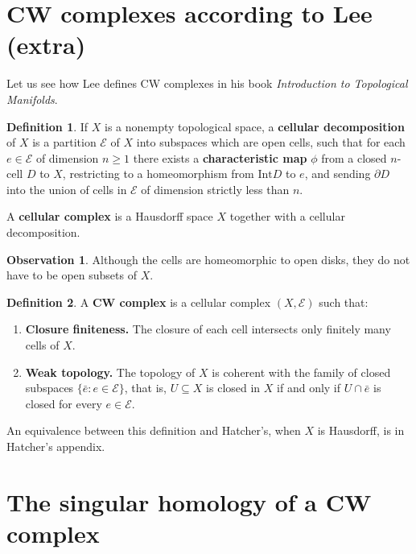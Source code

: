 \documentclass{book}
\theoremstyle{definition}
\newtheorem*{defn}{Definition}
\newtheorem*{obs}{Observation}
\begin{document}
\section{CW complexes according to Lee (extra)}

Let us see how Lee defines CW complexes in his book
\textit{Introduction to Topological Manifolds}.

\begin{defn}
If $X$ is a nonempty topological space, a \textbf{cellular
decomposition} of $X$ is a partition $\mathcal E$ of $X$ into
subspaces which are open cells, such that for each
$e\in\mathcal E$ of dimension $n\geq1$ there exists a
\textbf{characteristic map} $\phi$ from a closed $n$-cell $D$
to $X$, restricting to a homeomorphism from $\text{Int}D$ to
$e$, and sending $\partial D$ into the union of cells in
$\mathcal E$ of dimension strictly less than $n$.

A \textbf{cellular complex} is a Hausdorff space $X$ together
with a cellular decomposition.
\end{defn}

\begin{obs}
Although the cells are homeomorphic to open disks, they do
not have to be open subsets of $X$.
\end{obs}

\begin{defn}
A \textbf{CW complex} is a cellular complex $(X,\mathcal E)$
such that:
\begin{enumerate}
\item[\textbf{C}] \textbf{Closure finiteness.} The closure of
each cell intersects only finitely many cells of $X$.
\item[\textbf{W}] \textbf{Weak topology.} The topology of $X$
is coherent with the family of closed subspaces
$\{\bar e:e\in\mathcal E\}$, that is, $U\subseteq X$ is closed
in $X$ if and only if $U\cap\bar e$ is closed for every
$e\in\mathcal E$.
\end{enumerate}
An equivalence between this definition and Hatcher's, when
$X$ is Hausdorff, is in Hatcher's appendix.
\end{defn}

\section{The singular homology of a CW complex}
\end{document}

